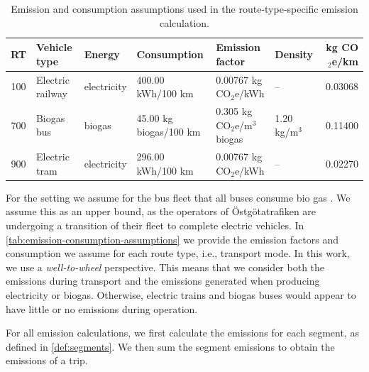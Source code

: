 \begin{table}[H]
\scriptsize
\caption{Emission and consumption assumptions used in the route-type-specific emission calculation.}
\label{tab:emission-consumption-assumptions}
\setlength{\tabcolsep}{3pt}
\renewcommand{\arraystretch}{1.1}

\begin{tabularx}{\textwidth}{c l l X X l r}
\toprule
\textbf{RT} & \textbf{Vehicle type} & \textbf{Energy} & \textbf{Consumption} & \textbf{Emission factor} & \textbf{Density} & \textbf{kg CO$_2$e/km} \\
\midrule
100 & Electric railway & electricity & 400.00 kWh/100 km \cite{andersson2006energy} & 0.00767 kg CO$_2$e/kWh \cite{climatiq_sweden_electricity_mix} & -- & 0.03068  \\
700 & Biogas bus & biogas & 45.00 kg biogas/100 km \cite{tica2019cng}& 0.305 kg CO$_2$e/m$^3$ biogas \cite{climatiq_bus_emission_factor}& 1.20 kg/m$^3$ \cite{biogas_composition} & 0.11400 \\
900 & Electric tram & electricity & 296.00 kWh/100 km \cite{procitybahn_energy_consumption_trams} & 0.00767 kg CO$_2$e/kWh \cite{climatiq_sweden_electricity_mix} & -- & 0.02270 \\
\bottomrule
\end{tabularx}
\end{table}


For the setting we assume for the bus fleet that all buses consume bio gas \cite{ostgotatrafiken_sustainability_report_2024}. We assume this as an upper bound, as the operators of Östgötatrafiken are undergoing a transition of their fleet to complete electric vehicles. In \autoref{tab:emission-consumption-assumptions} we provide the emission factors and consumption we assume for each route type, i.e., transport mode. In this work, we use a \textit{well-to-wheel} perspective. This means that we consider both the emissions during transport and the emissions generated when producing electricity or biogas. Otherwise, electric trains and biogas buses would appear to have little or no emissions during operation.



For all emission calculations, we first calculate the emissions for each segment, as defined in \autoref{def:segments}. We then sum the segment emissions to obtain the emissions of a trip. 

